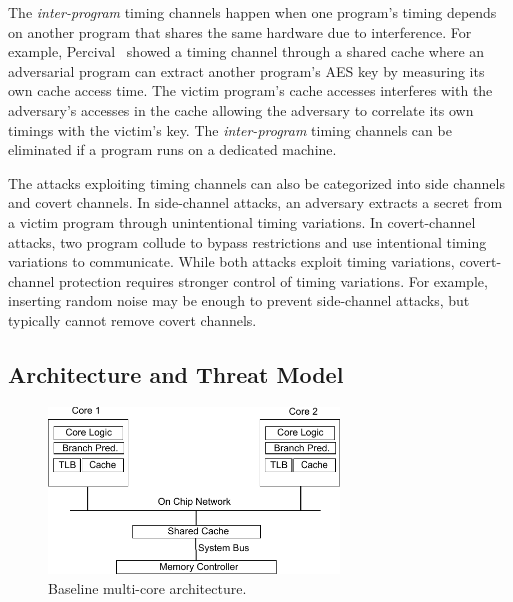 The {\em inter-program} timing channels happen when one program's timing depends
on another program that shares the same hardware due to interference. 
For example, Percival~\cite{percival} showed a timing channel
through a shared cache where an adversarial program can extract another program's AES key
by measuring its own cache access time.
The victim program's cache accesses interferes with the 
adversary's accesses in the cache allowing the adversary to correlate its own timings with 
the victim's key.
The {\em inter-program} timing channels can be eliminated if a program runs on a
dedicated machine.

The attacks exploiting timing channels can also be categorized into side channels
and covert channels. In side-channel attacks, an adversary extracts a secret from
a victim program through unintentional timing variations.
In covert-channel attacks, two program collude to bypass restrictions and use
intentional timing variations to communicate.
While both attacks exploit timing variations, covert-channel protection requires
stronger control of timing variations. For example, inserting random noise may be
enough to prevent side-channel attacks, but typically cannot remove covert channels.

\subsection{Architecture and Threat Model}


    \begin{figure}
        \begin{center}
            \includegraphics[width=3.04in]{figs/baseline.pdf}
            \caption{Baseline multi-core architecture.}
            \label{fig:baseline}
        \end{center}
    \end{figure}

